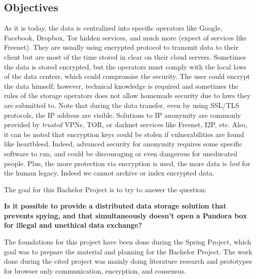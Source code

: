 
\subsection{Objectives}

As it is today, the data is centralized into specific operators like Google, Facebook, Dropbox, Tor hidden services, and much more (expect of services like Freenet\cite{Clarke2001Freenet:System}). They are usually using encrypted protocol to transmit data to their client but are most of the time stored in clear on their cloud servers. Sometimes the data is stored encrypted, but the operators must comply with the local laws of the data centers, which could compromise the security. The user could encrypt the data himself; however, technical knowledge is required and sometimes the rules of the storage operators does not allow homemade security due to laws they are submitted to. Note that during the data transfer, even by using SSL/TLS protocols, the IP address are visible. Solutions to IP anonymity are commonly provided by \textit{trusted} VPNs, TOR\cite{Dingledine2004Tor:Router}, or darknet services like Freenet, I2P\cite{Delmer2009LemergenceI2p}, etc. Also, it can be noted that encryption keys could be stolen if vulnerabilities are found like heartbleed\cite{Mehta2014TheBug}. Indeed, advanced security for anonymity requires some specific software to run, and could be discouraging or even dangerous for uneducated people. Plus, the more protection via encryption is used, the more data is \textit{lost} for the human legacy. Indeed we cannot archive or index encrypted data.

The goal for this Bachelor Project is to try to answer the question: 

\textbf{Is it possible to provide a distributed data storage solution that prevents spying, and that simultaneously doesn't open a Pandora box for illegal and unethical data exchange?}

The foundations for this project have been done during the Spring Project\cite{Claret2016OvercloudsSpringSession}, which goal was to prepare the material and planning for the Bachelor Project. The work done during the cited project was mainly doing literature research and prototypes for browser only communication, encryption, and consensus.





